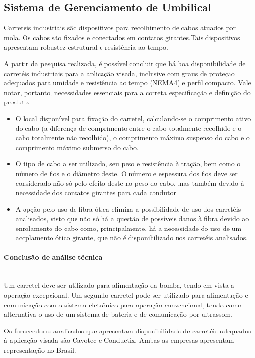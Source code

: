 \subsection{Sistema de Gerenciamento de Umbilical}

Carretéis industriais são dispositivos para recolhimento de cabos atuados por mola. Os cabos são fixados e conectados em contatos girantes.Tais dispositivos apresentam robustez estrutural e resistência ao tempo.
 
A partir da pesquisa realizada, é possível concluir que há boa disponibilidade de carretéis industriais para a aplicação visada, inclusive com graus de proteção adequados para umidade e resistência ao tempo (NEMA4) e perfil compacto. Vale notar, portanto, necessidades essenciais para a correta especificação e definição do produto:
\begin{itemize}
  \item O local disponível para fixação do carretel, calculando-se o comprimento ativo do cabo (a diferença de comprimento entre o cabo totalmente recolhido e o cabo totalmente não recolhido), o comprimento máximo suspenso do cabo e o comprimento máximo submerso do cabo.
  
  \item O tipo de cabo a ser utilizado, seu peso e resistência à tração, bem como o número de fios e o diâmetro deste. O número e espessura dos fios deve ser considerado não só pelo efeito deste no peso do cabo, mas também devido à necessidade dos contatos girantes para cada condutor
 
  \item A opção pelo uso de fibra ótica elimina a possibilidade de uso dos carretéis analisados, visto que não só há a questão de possíveis danos à fibra devido ao enrolamento do cabo como, principalmente, há a necessidade do uso de um acoplamento ótico girante, que não é disponibilizado nos carretéis analisados.
\end{itemize}
\paragraph{Conclusão de análise técnica}\mbox{}\\
 
Um carretel deve ser utilizado para alimentação da bomba, tendo em vista a operação excepcional. Um segundo carretel pode ser utilizado para alimentação e comunicação com o sistema eletrônico para operação convencional, tendo como alternativa o uso de um sistema de bateria e de comunicação por ultrassom.
 
Os fornecedores analisados que apresentam disponibilidade de carretéis adequados à aplicação visada são Cavotec e Conductix. Ambas as empresas apresentam representação no Brasil.
 